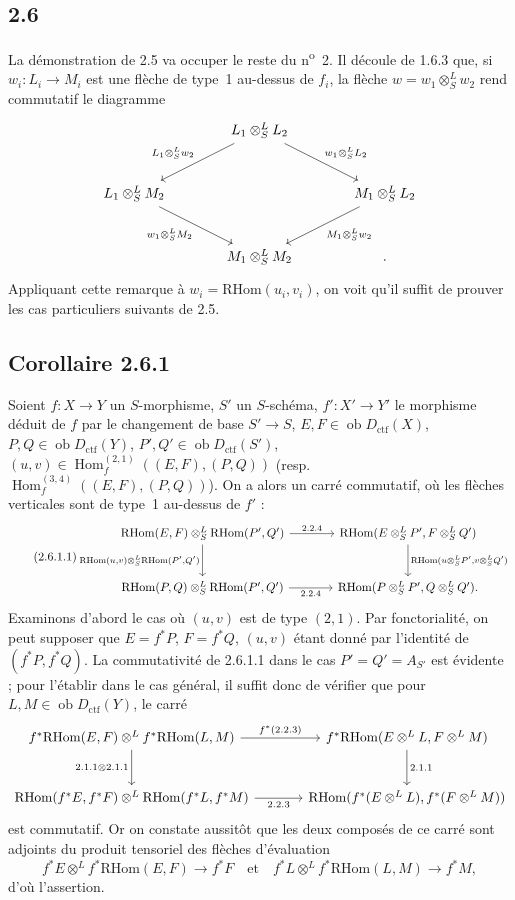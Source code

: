 \documentclass[11pt]{article}
\DeclareMathOperator{\Hom}{Hom}
\newcommand{\ob}{\operatorname{ob}}
\providecommand{\RHom}{\mathrm{RHom}}
\providecommand{\ctf}{\mathrm{ctf}}
\providecommand{\RHom}{\mathrm{RHom}}
\providecommand{\Hom}{\operatorname{Hom}}
\providecommand{\ob}{\operatorname{ob}}
\providecommand{\RHom}{\mathrm R\mathcal{H}om}
\providecommand{\RHom}{\mathrm{RHom}}
\providecommand{\Hom}{\operatorname{Hom}}
\begin{document}
\subsection*{2.6}
La démonstration de 2.5 va occuper le reste du n\textsuperscript{o}~2. Il découle de 1.6.3 que, si $w_i:L_i\to M_i$ est une flèche de type~1 au-dessus de $f_i$, la flèche $w=w_1\otimes^{L}_{S}w_2$ rend commutatif le diagramme
\[
\begin{tikzcd}[column sep=large,row sep=large]
& L_1\otimes^L_S L_2 \arrow[dl,"{L_1\otimes^L_S w_2}"'] \arrow[dr,"{w_1\otimes^L_S L_2}"] & \\
L_1\otimes^L_S M_2 \arrow[dr,"{w_1\otimes^L_S M_2}"'] & & M_1\otimes^L_S L_2 \arrow[dl,"{M_1\otimes^L_S w_2}"]\\
& M_1\otimes^L_S M_2 & .
\end{tikzcd}
\]
Appliquant cette remarque à $w_i=\RHom(u_i,v_i)$, on voit qu'il suffit de prouver les cas particuliers suivants de 2.5.

\subsection*{Corollaire 2.6.1}
Soient $f:X\to Y$ un $S$-morphisme, $S'$ un $S$-schéma, $f':X'\to Y'$ le morphisme déduit de $f$ par le changement de base $S'\to S$, $E,F\in\ob D_{\ctf}(X)$, $P,Q\in\ob D_{\ctf}(Y)$, $P',Q'\in\ob D_{\ctf}(S')$, $(u,v)\in\Hom_f^{(2,1)}((E,F),(P,Q))$ (resp. $\Hom_f^{(3,4)}((E,F),(P,Q))$). On a alors un carré commutatif, où les flèches verticales sont de type~1 au-dessus de $f'$ :
\begin{equation}\tag{2.6.1.1}
\begin{tikzcd}[column sep=large,row sep=large]
\RHom(E,F)\otimes^L_S\RHom(P',Q') \arrow[r,"2.2.4"] \arrow[d,"{\RHom(u,v)\otimes^L_S\RHom(P',Q')}"'] & \RHom(E\otimes^L_SP',F\otimes^L_SQ') \arrow[d,"{\RHom(u\otimes^L_SP',v\otimes^L_SQ')}"]\\
\RHom(P,Q)\otimes^L_S\RHom(P',Q') \arrow[r,"2.2.4"'] & \RHom(P\otimes^L_SP',Q\otimes^L_SQ').
\end{tikzcd}
\end{equation}
Examinons d'abord le cas où $(u,v)$ est de type $(2,1)$. Par fonctorialité, on peut supposer que $E=f^{*}P$, $F=f^{*}Q$, $(u,v)$ étant donné par l'identité de $(f^{*}P,f^{*}Q)$. La commutativité de 2.6.1.1 dans le cas $P'=Q'=A_{S'}$ est évidente ; pour l'établir dans le cas général, il suffit donc de vérifier que pour $L,M\in\ob D_{\ctf}(Y)$, le carré
\[
\begin{tikzcd}[column sep=large,row sep=large]
f^{*}\RHom(E,F)\otimes^L f^{*}\RHom(L,M) \arrow[r,"{f^*(2.2.3)}"] \arrow[d,"{2.1.1\otimes 2.1.1}"'] & f^{*}\RHom(E\otimes^LL,F\otimes^LM) \arrow[d,"2.1.1"]\\
\RHom(f^{*}E,f^{*}F)\otimes^L\RHom(f^{*}L,f^{*}M) \arrow[r,"2.2.3"'] & \RHom(f^{*}(E\otimes^LL),f^{*}(F\otimes^LM))
\end{tikzcd}
\]
est commutatif. Or on constate aussitôt que les deux composés de ce carré sont adjoints du produit tensoriel des flèches d'évaluation
\[
f^{*}E\otimes^L f^{*}\RHom(E,F)\longrightarrow f^{*}F
\quad\text{et}\quad
f^{*}L\otimes^L f^{*}\RHom(L,M)\longrightarrow f^{*}M,
\]
d'où l'assertion.
\end{document}
